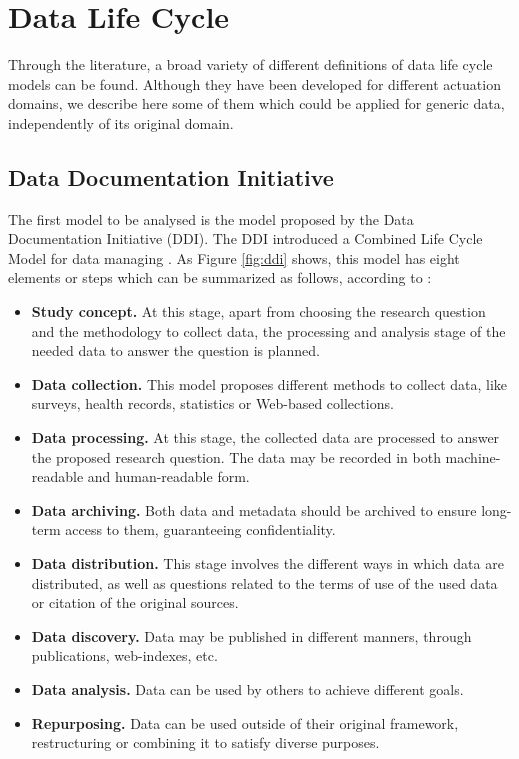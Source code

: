 \section{Data Life Cycle}

Through the literature, a broad variety of different definitions of data life cycle models can be found. Although they have been developed for different actuation domains, we describe here some of them which could be applied for generic data, independently of its original domain.

\subsection{Data Documentation Initiative}

The first model to be analysed is the model proposed by the Data Documentation Initiative (DDI). The DDI introduced a Combined Life Cycle Model for data managing \cite{data_documentation_initiative_overview_2008}. As Figure \ref{fig:ddi} shows, this model has eight elements or steps which can be summarized as follows, according to \cite{ball_review_2012}:

\begin{itemize}
    \item \textbf{Study concept.} At this stage, apart from choosing the research question and the methodology to collect data, the processing and analysis stage of the needed data to answer the question is planned.
    \item \textbf{Data collection.} This model proposes different methods to collect data, like surveys, health records, statistics or Web-based collections.
    \item \textbf{Data processing.} At this stage, the collected data are processed to answer the proposed research question. The data may be recorded in both machine-readable and human-readable form.
    \item \textbf{Data archiving.} Both data and metadata should be archived to ensure long-term access to them, guaranteeing confidentiality.
    \item \textbf{Data distribution.} This stage involves the different ways in which data are distributed, as well as questions related to the terms of use of the used data or citation of the original sources.
    \item \textbf{Data discovery.} Data may be published in different manners, through publications, web-indexes, etc.
    \item \textbf{Data analysis.} Data can be used by others to achieve different goals.
    \item \textbf{Repurposing.} Data can be used outside of their original framework, restructuring or combining it to satisfy diverse purposes.
\end{itemize}

